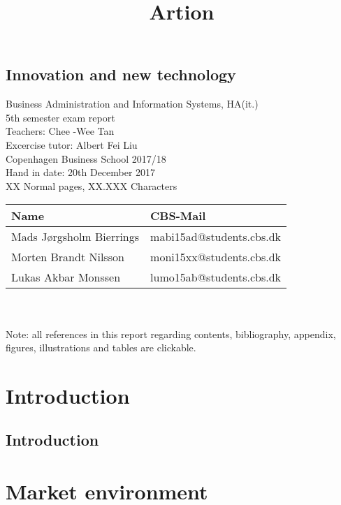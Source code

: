 \documentclass[a4paper,11pt,fleqn,dvipsnames,oneside,openright]{memoir}
\begin{document}
\title{Artion}
\maketitle

\section*{Innovation and new technology}

Business Administration and Information Systems, HA(it.) \\
5th semester exam report\\
Teachers: Chee -Wee Tan\\
Excercise tutor: Albert Fei Liu\\
Copenhagen Business School 2017/18\\
Hand in date: 20th December 2017\\
XX Normal pages, XX.XXX Characters\\

\begin{tabu} to 0.8\textwidth { | X[l] | X[c] | }
   \hline
   \textbf{Name} & \textbf{CBS-Mail} \\
    \hline
   Mads Jørgsholm Bierrings  & mabi15ad@students.cbs.dk \\
    \hline
   Morten Brandt Nilsson  & moni15xx@students.cbs.dk \\
    \hline
   Lukas Akbar Monssen   & lumo15ab@students.cbs.dk \\
    \hline
\end{tabu}
\\\\
Note: all references in this report regarding contents, bibliography, appendix, figures, illustrations and tables are clickable. 

\newpage
\tableofcontents*
\thispagestyle{empty}

\mainmatter 

\chapter{Introduction}
\section{Introduction}


\chapter{Market environment}
\label{Market}

\end{document}
